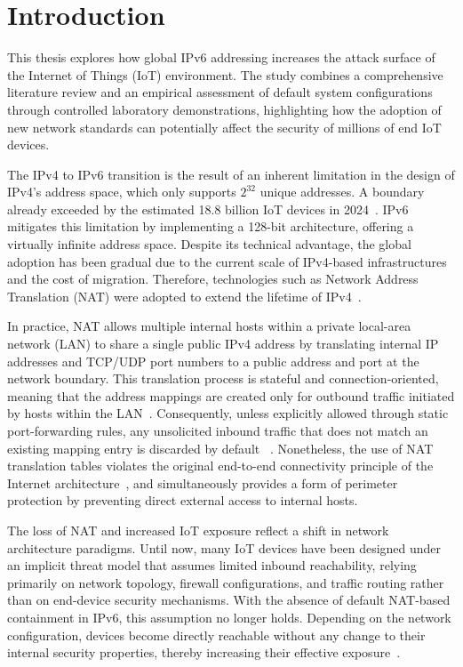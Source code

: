 \chapter{Introduction}
This thesis explores how global IPv6 addressing increases the attack surface of the Internet of Things (IoT) environment. The study combines a comprehensive literature review and an empirical assessment of default system configurations through controlled laboratory demonstrations, highlighting how the adoption of new network standards can potentially affect the security of millions of end IoT devices.

The IPv4 to IPv6 transition is the result of an inherent limitation in the design of IPv4’s address space, which only supports $2^{32}$ unique addresses. A boundary already exceeded by the estimated 18.8 billion IoT devices in 2024~\cite{iotanalytics2024}. IPv6 mitigates this limitation by implementing a 128-bit architecture, offering a virtually infinite address space. Despite its technical advantage, the global adoption has been gradual due to the current scale of IPv4-based infrastructures and the cost of migration. Therefore, technologies such as Network Address Translation (NAT) were adopted to extend the lifetime of IPv4~\cite{rfc3022}.

In practice, NAT allows multiple internal hosts within a private local-area network (LAN) to share a single public IPv4 address by translating internal IP addresses and TCP/UDP port numbers to a public address and port at the network boundary. This translation process is stateful and connection-oriented, meaning that the address mappings are created only for outbound traffic initiated by hosts within the LAN~\cite{rfc3022,rfc4787}. Consequently, unless explicitly allowed through static port-forwarding rules, any unsolicited inbound traffic that does not match an existing mapping entry is discarded by default ~\cite{rfc4787}. Nonetheless, the use of NAT translation tables violates the original end-to-end connectivity principle of the Internet architecture~\cite{saltzer1984end}, and simultaneously provides a form of perimeter protection by preventing direct external access to internal hosts. 

The loss of NAT and increased IoT exposure reflect a shift in network architecture paradigms. Until now, many IoT devices have been designed under an implicit threat model that assumes limited inbound reachability, relying primarily on network topology, firewall configurations, and traffic routing rather than on end-device security mechanisms. With the absence of default NAT-based containment in IPv6, this assumption no longer holds. Depending on the network configuration, devices become directly reachable without any change to their internal security properties, thereby increasing their effective exposure~\cite{saltzer1984end,rfc8200, rye2025firewalls}.

